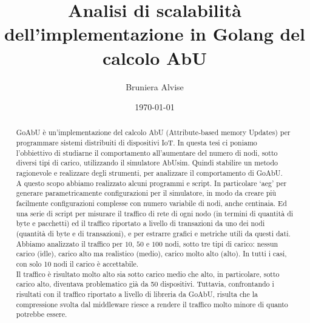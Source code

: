 \documentclass[12pt, a4paper]{article}
\title{Analisi di scalabilità dell'implementazione in Golang del calcolo AbU}
\author{Bruniera Alvise}
\affil{Università degli studi di Udine}
\date{\today}
\begin{document}
\maketitle

\newpage
\begin{abstract}
    GoAbU è un'implementazione del calcolo AbU (Attribute-based memory Updates) per programmare sistemi distribuiti di dispositivi IoT. In questa tesi ci poniamo l'obbiettivo di studiarne il comportamento all'aumentare del numero di nodi, sotto diversi tipi di carico, utilizzando il simulatore AbUsim. Quindi stabilire un metodo ragionevole e realizzare degli strumenti, per analizzare il comportamento di GoAbU.\\
    A questo scopo abbiamo realizzato alcuni programmi e script. In particolare `aeg' per generare parametricamente configurazioni per il simulatore, in modo da creare più facilmente configurazioni complesse con numero variabile di nodi, anche centinaia. Ed una serie di script per misurare il traffico di rete di ogni nodo (in termini di quantità di byte e pacchetti) ed il traffico riportato a livello di transazioni da uno dei nodi (quantità di byte e di transazioni), e per estrarre grafici e metriche utili da questi dati.\\
    Abbiamo analizzato il traffico per $10$, $50$ e $100$ nodi, sotto tre tipi di carico: nessun carico (idle), carico alto ma realistico (medio), carico molto alto (alto). In tutti i casi, con solo 10 nodi il carico è accettabile.\\
    Il traffico è risultato molto alto sia sotto carico medio che alto, in particolare, sotto carico alto, diventava problematico già da 50 dispositivi. Tuttavia, confrontando i risultati con il traffico riportato a livello di libreria da GoAbU, risulta che la compressione svolta dal middleware riesce a rendere il traffico molto minore di quanto potrebbe essere.


\end{abstract}
\end{document}
